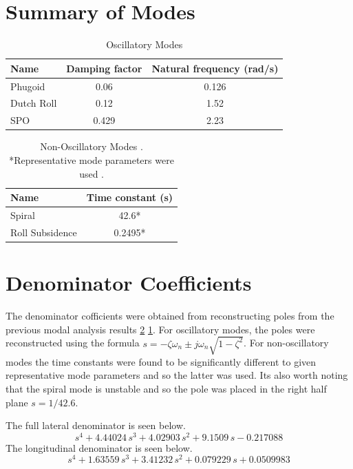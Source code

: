 \documentclass{article}
\begin{document}
\section{Summary of Modes}

\begin{table}[H]
  \centering
  \begin{tabular}{lcc}
      \toprule
      Name & Damping factor & Natural frequency (rad/s) \\
      \midrule
      Phugoid & 0.06 & 0.126 \\
      Dutch Roll & 0.12 & 1.52 \\
      SPO & 0.429 & 2.23 \\
      \bottomrule
  \end{tabular}
  \caption{Oscillatory Modes \cite{e2}}
    \label{tab:oscillatory_modes}
\end{table}

\begin{table}[H]
  \centering
  \begin{tabular}{lc}
      \toprule
      Name & Time constant (s) \\
      \midrule
      Spiral & 42.6* \\
      Roll Subsidence & 0.2495* \\
      \bottomrule
  \end{tabular}
  \caption{Non-Oscillatory Modes \cite{e2}. *Representative mode parameters were used \cite{rep}.}
  \label{tab:non_oscillatory_modes}
\end{table}

\section{Denominator Coefficients}

The denominator cofficients were obtained from reconstructing poles from the previous modal analysis results \ref{tab:non_oscillatory_modes} \ref{tab:oscillatory_modes}.
For oscillatory modes, the poles were reconstructed using the formula $s = -\zeta\omega_n \pm j\omega_n\sqrt{1-\zeta^2}$.
For non-oscillatory modes the time constants were found to be significantly different to given representative mode parameters \cite{rep} and so the latter was used.
Its also worth noting that the spiral mode is unstable and so the pole was placed in the right half plane $s = 1/42.6$.

The full lateral denominator is seen below. 
\begin{equation}
  s^4+4.44024\,s^3+4.02903\,s^2+9.1509\,s-0.217088
\end{equation}
The longitudinal denominator is seen below.
\begin{equation}
  s^4+1.63559\,s^3+3.41232\,s^2+0.079229\,s+0.0509983
\end{equation}
\end{document}
